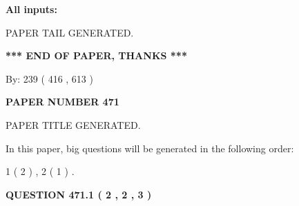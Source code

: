 \documentclass[12pt]{article}
\begin{document}
   
   
   
\noindent{}
   
   
   
   
\noindent\vspace{0.1in}\hspace{-0.08in} {\textbf{\Large{All inputs: }}}
   
   
   
   
   
   
 \vspace{0.2in}
 
   
   
\vspace{2.0in} PAPER TAIL GENERATED.
   
   
   
   
\vspace{1.0in} 
{\textbf{\large{ *** END OF PAPER, THANKS *** }}} 
   
   
\hspace{1.0in} By: 
 239 ( 416 ,  613 )
   
   
   
   
\newpage 
\setcounter{page}{ 
   471001 } 
   
   
   
   
 {\textbf{ \Large{ PAPER NUMBER  471  }}}
   
   
\vspace{0.2in}
   
   
   
   
   
   
   
   
 \vspace{0.2in}
 
 
 
 
   
   
 PAPER TITLE GENERATED.
   
   
   
\vspace{0.2in}
   
In this paper, big questions will be generated in the following order: 
   
   
   1 ( 2 )
 ,
   2 ( 1 )
 .
  
\vspace{0.2in}
  
{\textbf{\Large{QUESTION
471.1 
 ( 2 , 2 , 3 )
}}}
  
\end{document}
